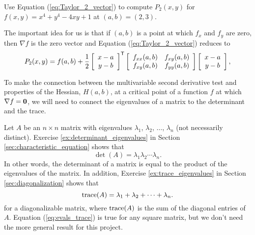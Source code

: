\begin{pactivity} \label{ex:example_1} Use Equation (\ref{eq:Taylor_2_vector}) to compute $P_2(x,y)$ for $f(x,y)=x^4+y^4-4xy+1$ at $(a, b)=(2,3)$. 

\end{pactivity}

The important idea for us is that if $(a, b)$ is a point at which $f_x$ and $f_y$ are zero, then $\nabla f$ is the zero vector and Equation (\ref{eq:Taylor_2_vector}) reduces to 
\begin{equation} \label{eq:Taylor_2_vector_2}
P_2(x,y) = f(a,b) +  \frac{1}{2}\left[ \begin{array}{c} x-a\\y-b \end{array} \right]^{\mathsf{T}} \left[ \begin{array}{cc} f_{xx}(a,b)&f_{xy}(a,b) \\ f_{xy}(a,b)& f_{yy}(a,b) \end{array} \right] \left[ \begin{array}{c} x-a\\y-b \end{array} \right],
\end{equation}

To make the connection between the multivariable second derivative test and properties of the Hessian, $H(a,b)$, at a critical point of a function $f$ at which $\nabla f = \mathbf{0}$, we will need to connect the eigenvalues of a matrix to the determinant and the trace.

Let $A$ be an $n \times n$ matrix with eigenvalues $\lambda_1$, $\lambda_2$, $\ldots$, $\lambda_n$ (not necessarily distinct). 
Exercise \ref{ex:determinant_eigenvalues} in Section \ref{sec:characteristic_equation} shows that 
\begin{equation} \label{eq:evals_det}
\det(A) = \lambda_1 \lambda_2 \cdots \lambda_n.
\end{equation}
In other words, the determinant of a matrix is equal to the product of the eigenvalues of the matrix. In addition, Exercise \ref{ex:trace_eigenvalues} in Section \ref{sec:diagonalization} shows that 
\begin{equation} \label{eq:evals_trace}
\text{trace}(A) = \lambda_1 +  \lambda_2 + \cdots + \lambda_n.
\end{equation}
for a diagonalizable matrix, where $\text{trace}(A)$ is the sum of the diagonal entries of $A$. Equation (\ref{eq:evals_trace}) is true for any square matrix, but we don't need the more general result for this project.  


